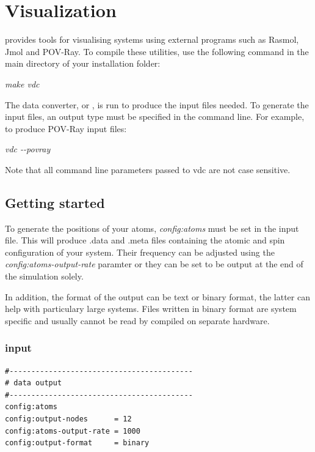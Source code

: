 \chapter{Visualization}\label{chap:visualization}

\vampire provides tools for visualising systems using external programs such as Rasmol, Jmol and POV-Ray. To compile these utilities, use the following command in the main directory of your \vampire installation folder:

\noindent
\begin{minipage}[c]{\textwidth}
\centering
\textit{make vdc}
\end{minipage}

The \vampire data converter, or \vdc, is run to produce the input files needed. To generate the input files, an output type must be specified in the command line. For example, to produce POV-Ray input files:

\noindent
\begin{minipage}[c]{\textwidth}
\centering
\textit{vdc -{}-povray}
\end{minipage}

Note that all command line parameters passed to vdc are not case sensitive.

\section*{Getting started}

To generate the positions of your atoms, \textit{config:atoms} must be set in the input file. This will produce .data and .meta files containing the atomic and spin configuration of your system. Their frequency can be adjusted using the \textit{config:atoms-output-rate} paramter or they can be set to be output at the end of the simulation solely.

In addition, the format of the output can be text or binary format, the latter can help with particulary large systems. Files written in binary format are system specific and usually cannot be read by \vdc compiled on separate hardware.

\subsection*{input}
{\footnotesize
\begin{verbatim}
#------------------------------------------
# data output
#------------------------------------------
config:atoms
config:output-nodes      = 12
config:atoms-output-rate = 1000
config:output-format     = binary
\end{verbatim}
}


